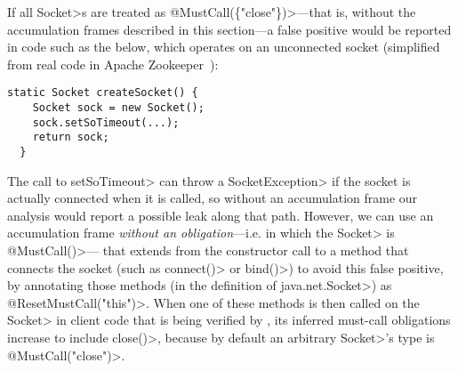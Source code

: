 If all \<Socket>s are treated as \<@MustCall(\{"close"\})>---that is,
without the accumulation frames described in this section---a false positive
would be reported
in code such as the below, which operates on an unconnected socket
(simplified from real code in Apache Zookeeper~):

\begin{lstlisting}[frame=tb,belowskip=3mm]
  static Socket createSocket() {
    Socket sock = new Socket();
    sock.setSoTimeout(...);
    return sock;
  }
\end{lstlisting}

The call to \<setSoTimeout> can throw a \<SocketException> if the
socket is actually connected when it is called, so without an
accumulation frame our analysis would report a possible leak along
that path.  However, we can use an accumulation frame \emph{without an
  obligation}---i.e. in which the \<Socket> is \<@MustCall({})>---
that extends from the constructor call to a method that connects the
socket (such as \<connect()> or \<bind()>) to avoid this false
positive, by annotating those methods (in the definition of
\<java.net.Socket>) as \<@ResetMustCall("this")>.  When one of these
methods is then called on the \<Socket> in client code that is being
verified by \Tool, its inferred must-call obligations increase to include
\<close()>, because by default an arbitrary \<Socket>'s type is
\<@MustCall("close")>.

